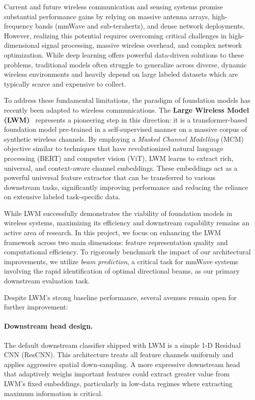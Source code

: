 \documentclass[12pt,a4paper]{article}
\begin{document}
Current and future wireless communication and sensing systems promise substantial performance gains by relying on massive antenna arrays, high-frequency bands (mmWave and sub-terahertz), and dense network deployments. However, realizing this potential requires overcoming critical challenges in high-dimensional signal processing, massive wireless overhead, and complex network optimization. While deep learning offers powerful data-driven solutions to these problems, traditional models often struggle to generalize across diverse, dynamic wireless environments and heavily depend on large labeled datasets which are typically scarce and expensive to collect.

To address these fundamental limitations, the paradigm of foundation models has recently been adapted to wireless communications. The \textbf{Large Wireless Model (LWM)}~\cite{lwm} represents a pioneering step in this direction: it is a transformer-based foundation model pre-trained in a self-supervised manner on a massive corpus of synthetic wireless channels. By employing a \emph{Masked Channel Modelling} (MCM) objective similar to techniques that have revolutionized natural language processing (BERT) and computer vision (ViT), LWM learns to extract rich, universal, and context-aware channel embeddings. These embeddings act as a powerful universal feature extractor that can be transferred to various downstream tasks, significantly improving performance and reducing the reliance on extensive labeled task-specific data.

While LWM successfully demonstrates the viability of foundation models in wireless systems, maximizing its efficiency and downstream capability remains an active area of research. In this project, we focus on enhancing the LWM framework across two main dimensions: feature representation quality and computational efficiency. To rigorously benchmark the impact of our architectural improvements, we utilize \emph{beam prediction}, a critical task for mmWave systems involving the rapid identification of optimal directional beams, as our primary downstream evaluation task. 

Despite LWM's strong baseline performance, several avenues remain open for further improvement:

\paragraph{Downstream head design.}
The default downstream classifier shipped with LWM is a simple 1-D Residual CNN (ResCNN). This architecture treats all feature channels uniformly and applies aggressive spatial down-sampling. A more expressive downstream head that adaptively weighs important features could extract greater value from LWM's fixed embeddings, particularly in low-data regimes where extracting maximum information is critical.
\end{document}
